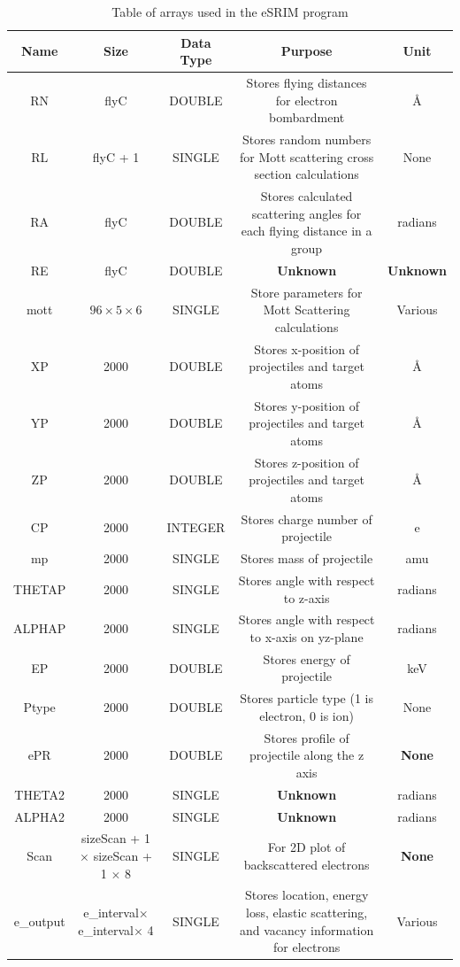 \documentclass[10pt, reqno]{exam}
\begin{document}
\begin{table}[h]
    \centering
    \caption{Table of arrays used in the eSRIM program}
    \footnotesize
    \begin{tabular}{|c|c|c|c|c|}
        \hline
        Name & Size & Data Type & Purpose & Unit \\
        \hline
        RN  & flyC & DOUBLE & Stores flying distances for electron bombardment & \si{\angstrom} \\
        RL  & flyC + 1 & SINGLE & Stores random numbers for Mott scattering cross section calculations & None \\
        RA  & flyC & DOUBLE & Stores calculated scattering angles for each flying distance in a group & radians \\
        RE  & flyC & DOUBLE & \textbf{Unknown} & \textbf{Unknown} \\
        mott & $96\times 5\times 6$ & SINGLE & Store parameters for Mott Scattering calculations & Various \\
        XP & 2000 & DOUBLE & Stores x-position of projectiles and target atoms & \si{\angstrom} \\
        YP & 2000 & DOUBLE & Stores y-position of projectiles and target atoms & \si{\angstrom} \\
        ZP & 2000 & DOUBLE & Stores z-position of projectiles and target atoms & \si{\angstrom} \\
        CP & 2000 & INTEGER & Stores charge number of projectile & e \\
        mp & 2000 & SINGLE & Stores mass of projectile & amu \\
        THETAP & 2000 & SINGLE & Stores angle with respect to z-axis & radians \\
        ALPHAP & 2000 & SINGLE & Stores angle with respect to x-axis on yz-plane & radians \\
        EP & 2000 & DOUBLE & Stores energy of projectile & keV \\
        Ptype & 2000 & DOUBLE & Stores particle type (1 is electron, 0 is ion) & None \\
        ePR & 2000 & DOUBLE & Stores profile of projectile along the z axis & \textbf{None} \\
        THETA2 & 2000 & SINGLE & \textbf{Unknown} & radians \\
        ALPHA2 & 2000 & SINGLE & \textbf{Unknown} & radians \\
        Scan & sizeScan + 1 $\times$ sizeScan + 1 $\times$ 8 & SINGLE & For 2D plot of backscattered electrons & \textbf{None} \\
        e\_output & e\_interval$\times$ e\_interval$\times$ 4  &  SINGLE  & Stores location, energy loss, elastic scattering, and vacancy information for electrons & Various   \\
        \hline
    \end{tabular}
    \label{tbl:arrays} \\
\end{table}
\end{document}
